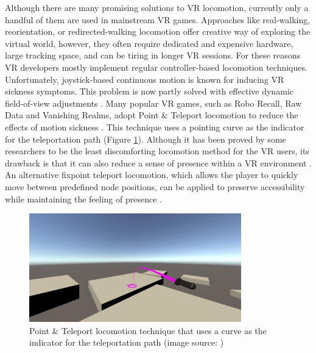 Although there are many promising solutions to VR locomotion, currently only a handful of them are used in mainstream VR games. Approaches like real-walking, reorientation, or redirected-walking locomotion offer creative way of exploring the virtual world, however, they often require dedicated and expensive hardware, large tracking space, and can be tiring in longer VR sessions. For these reasons VR developers mostly implement regular controller-based locomotion techniques. Unfortunately, joystick-based continuous motion is known for inducing VR sickness symptoms. This problem is now partly solved with effective dynamic field-of-view adjustments \cite{DYNAMICFOD}. Many popular VR games, such as Robo Recall, Raw Data and Vanishing Realms, adopt Point \& Teleport locomotion to reduce the effects of motion sickness \cite{TELEPORTATIONGAMES}. This technique uses a pointing curve as the indicator for the teleportation path (Figure \ref{fig:TELEPORTATIONCURVEIMAGE}). Although it has been proved by some researchers to be the least discomforting locomotion method for the VR users, its drawback is that it can also reduce a sense of presence within a VR environment \cite{TELEPORTATIONEFFECTS}. An alternative fixpoint teleport locomotion, which allows the player to quickly move between predefined node positions, can be applied to preserve accessibility while maintaining the feeling of presence \cite{NODEBASEDTELEPORTATION}.

\begin{figure}[th]
\centering
\includegraphics[width=0.82\textwidth]{img/teleportation_curve.png}
\caption{Point \& Teleport locomotion technique that uses a curve as the indicator for the teleportation path (image source: \cite{TELEPORTATIONCURVE})}
\label{fig:TELEPORTATIONCURVEIMAGE}
\end{figure}


